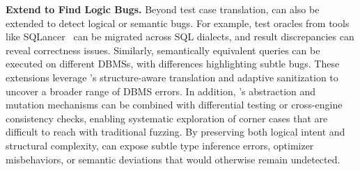\documentclass[sigconf,review,anonymous]{acmart}
\begin{document}

\textbf{Extend \tool{} to Find Logic Bugs.} 
Beyond test case translation, \tool{} can also be extended to detect logical or semantic bugs. For example, test oracles from tools like SQLancer~\cite{sqlancer} can be migrated across SQL dialects, and result discrepancies can reveal correctness issues. Similarly, semantically equivalent queries can be executed on different DBMSs, with differences highlighting subtle bugs. These extensions leverage \tool{}’s structure-aware translation and adaptive sanitization to uncover a broader range of DBMS errors. In addition, \tool{}’s abstraction and mutation mechanisms can be combined with differential testing or cross-engine consistency checks, enabling systematic exploration of corner cases that are difficult to reach with traditional fuzzing. By preserving both logical intent and structural complexity, \tool{} can expose subtle type inference errors, optimizer misbehaviors, or semantic deviations that would otherwise remain undetected.


\end{document}
